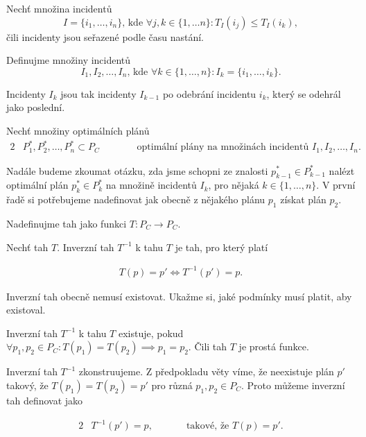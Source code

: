 Nechť množina incidentů 
\begin{equation}
  I = \{ i_1, \dots , i_n \} \text{, kde } \forall j, k \in \{ 1, \dots n\} \colon T_I(i_j) \leq T_I(i_k),
\end{equation}
čili incidenty jsou seřazené podle času nastání.

Definujme množiny incidentů
\begin{equation}\label{df:INC}
  I_1, I_2, \dots, I_n \text{, kde } \forall k \in \{ 1, \dots, n \} \colon I_k = \{ i_1, \dots, i_k \}.
\end{equation}

Incidenty $I_k$ jsou tak incidenty $I_{k-1}$ po odebrání incidentu $i_k$, který se odehrál jako poslední.

Nechť množiny optimálních plánů
\begin{alignat}{2}
  & P^*_{1}, P^*_2, \dots, P^*_{n} \subset P_C \quad && \hspace{15pt} \text{optimální plány na množinách incidentů $I_{1}, I_2, \dots, I_n$.}
\end{alignat}

Nadále budeme zkoumat otázku, zda jsme schopni ze znalosti $p^*_{k-1} \in P^*_{k-1}$ nalézt optimální plán $p^*_k \in P^*_k$ na množině incidentů $I_k$, pro nějaká $k \in \{ 1, \dots, n \}$.
V první řadě si potřebujeme nadefinovat jak obecně z nějakého plánu $p_1$ získat plán $p_2$. 
\begin{definice}[Tah]\label{df:tah}
  Nadefinujme tah jako funkci $T \colon P_C \rightarrow P_C$.
\end{definice}

\begin{definice}\label{df:tah}
  Nechť tah $T$. Inverzní tah $T^{-1}$ k tahu $T$ je tah, pro který platí

  \begin{align*}
    T(p) = p' \Leftrightarrow T^{-1}(p') = p.
  \end{align*}
\end{definice}


Inverzní tah obecně nemusí existovat. Ukažme si, jaké podmínky musí platit, aby existoval.

\begin{veta}\label{veta:inverzNutnost}
  Inverzní tah $T^{-1}$ k tahu $T$ existuje, pokud $\forall p_1, p_2 \in P_C \colon T(p_1) = T(p_2) \implies p_1 = p_2$.
  Čili tah $T$ je prostá funkce.

\end{veta}
\begin{dukaz}
  Inverzní tah $T^{-1}$ zkonstruujeme.
  Z předpokladu věty víme, že neexistuje plán $p'$ takový, že $T(p_1) = T(p_2) = p'$ pro různá $p_1, p_2 \in P_C$. 
  Proto můžeme inverzní tah definovat jako

  \begin{alignat*}{2}
    & T^{-1}(p') = p, \quad && \hspace{10pt} \text{takové, že $T(p) = p'$}.
  \end{alignat*}
\end{dukaz}

